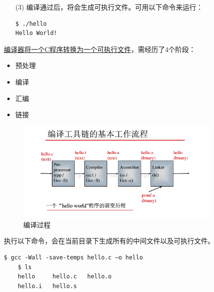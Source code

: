 \begin{frame}[fragile]\ft{\secname}
  \begin{itemize}
  \item[(3)] 编译通过后，将会生成可执行文件。可用以下命令来运行：
    \begin{lstlisting}[backgroundcolor=\color{red!10}]
$ ./hello
Hello World!
    \end{lstlisting}
  \end{itemize}
\end{frame}



\begin{frame}[fragile]\ft{\secname}
  \href{https://blog.csdn.net/elfprincexu/article/details/45043971}{编译器将一个C程序转换为一个可执行文件}，需经历了4个阶段：
  \begin{itemize}
  \item 预处理
  \item 编译
  \item 汇编
  \item 链接
  \end{itemize}

  \begin{figure}
    \centering
    \includegraphics[width=4in]{ch01/images/compile.png}
    \caption{编译过程}
    \label{fig:1}
  \end{figure}
  
\end{frame}


\begin{frame}[fragile]\ft{\secname}
  执行以下命令，会在当前目录下生成所有的中间文件以及可执行文件。
  \begin{lstlisting}[backgroundcolor=\color{red!10}]
    $ gcc -Wall -save-temps hello.c –o hello 
    $ ls 
    hello     hello.c   hello.o
    hello.i   hello.s
  \end{lstlisting}
\end{frame}



